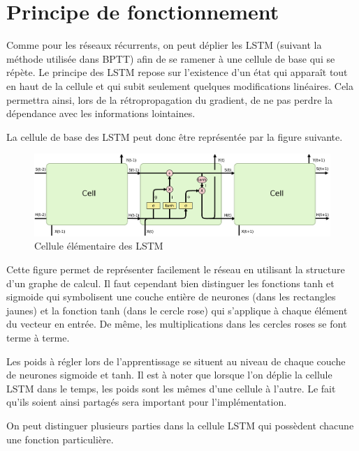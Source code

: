 \newpage

\section{Principe de fonctionnement}
Comme pour les réseaux récurrents, on peut déplier les LSTM (suivant la méthode utilisée dans BPTT) afin de se ramener à une cellule de base qui se répète. Le principe des LSTM repose sur l'existence d'un état qui apparaît tout en haut de la cellule et qui subit seulement quelques modifications linéaires. Cela permettra ainsi, lors de la rétropropagation du gradient, de ne pas perdre la dépendance avec les informations lointaines.

La cellule de base des LSTM peut donc être représentée par la figure suivante.

\begin{figure}[h!]
\begin{center}
\includegraphics[scale=0.12]{images/chapter6/LSTM_article_plusieurscell.png}
\caption{Cellule élémentaire des LSTM}
\label{cellule LSTM}
\end{center}
\end{figure}

Cette figure permet de représenter facilement le réseau en utilisant la structure d'un graphe de calcul. Il faut cependant bien distinguer les fonctions tanh et sigmoide qui symbolisent une couche entière de neurones (dans les rectangles jaunes) et la fonction tanh (dans le cercle rose) qui s'applique à chaque élément du vecteur en entrée. De même, les multiplications dans les cercles roses se font terme à terme.

Les poids à régler lors de l'apprentissage se situent au niveau de chaque couche de neurones sigmoide et tanh. Il est à noter que lorsque l'on déplie la cellule LSTM dans le temps, les poids sont les mêmes d'une cellule à l'autre. Le fait qu'ils soient ainsi partagés sera important pour l'implémentation.

On peut distinguer plusieurs parties dans la cellule LSTM qui possèdent chacune une fonction particulière.

